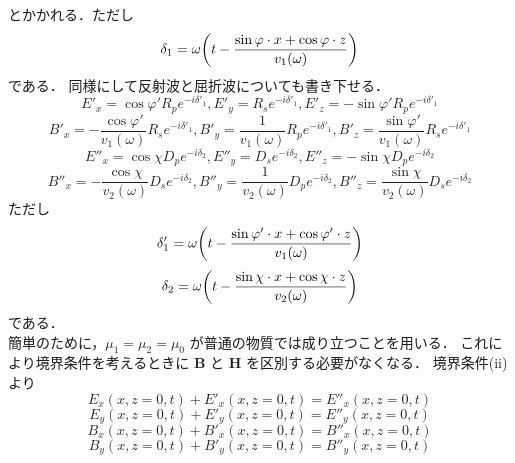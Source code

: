 \documentclass{jsarticle}
\numberwithin{equation}{section}
\theoremstyle{definition}
\begin{document}
とかかれる．ただし
\begin{equation}
    \delta_1 = \omega \qty( t - \frac{\sin \varphi \cdot x + \cos \varphi \cdot z}{v_1 (\omega)} )
\end{equation}
である．
同様にして反射波と屈折波についても書き下せる．
\begin{equation}
    E'_x = \cos \varphi' R_p e^{-i \delta'_1}, E'_y = R_s e^{-i \delta'_1}, E'_z = - \sin \varphi' R_p e^{-i \delta'_1} 
\end{equation}
\begin{equation}
    B'_x = -\frac{\cos \varphi' }{v_1 (\omega)} R_s e^{-i \delta'_1}, B'_y = \frac{1}{v_1 (\omega)}R_p e^{-i \delta'_1}, B'_z = \frac{\sin \varphi' }{v_1 (\omega)} R_s e^{-i \delta'_1}
\end{equation}
\begin{equation}
    E''_x = \cos \chi D_p e^{-i \delta_2}, E''_y = D_s e^{-i \delta_2}, E''_z = - \sin \chi D_p e^{-i \delta_2} 
\end{equation}
\begin{equation}
    B''_x = -\frac{\cos \chi }{v_2 (\omega)} D_s e^{-i \delta_2}, B''_y = \frac{1}{v_2 (\omega)}D_p e^{-i \delta_2}, B''_z = \frac{\sin \chi }{v_2 (\omega)} D_s e^{-i \delta_2}
\end{equation}
ただし
\begin{equation}
    \delta'_1 = \omega \qty( t - \frac{\sin \varphi' \cdot x + \cos \varphi' \cdot z}{v_1 (\omega)} )
\end{equation}
\begin{equation}
    \delta_2 = \omega \qty( t - \frac{\sin \chi \cdot x + \cos \chi \cdot z}{v_2 (\omega)} )
\end{equation}
である．\\
\quad 簡単のために，$\mu_1 = \mu_2 = \mu_0$ が普通の物質では成り立つことを用いる．
これにより境界条件を考えるときに $\bm{B}$ と $\bm{H}$ を区別する必要がなくなる．
境界条件(ii)より 
\begin{equation}
    E_x (x, z = 0, t) + E'_x (x, z = 0, t) = E''_x (x, z = 0, t)
\end{equation}
\begin{equation}
    E_y (x, z = 0, t) + E'_y (x, z = 0, t) = E''_y (x, z = 0, t)
\end{equation}
\begin{equation}
    B_x (x, z = 0, t) + B'_x (x, z = 0, t) = B''_x (x, z = 0, t)
\end{equation}
\begin{equation}
    B_y (x, z = 0, t) + B'_y (x, z = 0, t) = B''_y (x, z = 0, t)
\end{equation}
\end{document}
